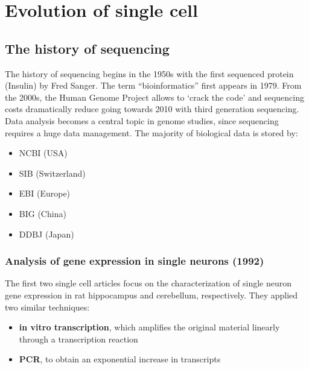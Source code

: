 \graphicspath{{chapters/01/}}
\chapter{Evolution of single cell}

\hypertarget{the-history-of-sequencing}{%
\section{The history of sequencing}\label{the-history-of-sequencing}}

The history of sequencing begins in the 1950s with the first sequenced
protein (Insulin) by Fred Sanger. The term ``bioinformatics'' first
appears in 1979. From the 2000s, the Human Genome Project allows to
`crack the code' and sequencing costs dramatically reduce going towards
2010 with third generation sequencing. Data analysis becomes a central
topic in genome studies, since sequencing requires a huge data
management. The majority of biological data is stored by:

\begin{itemize}
\tightlist
\item
  NCBI (USA)
\item
  SIB (Switzerland)
\item
  EBI (Europe)
\item
  BIG (China)
\item
  DDBJ (Japan)
\end{itemize}

\hypertarget{analysis-of-gene-expression-in-single-neurons-1992}{%
\subsection{Analysis of gene expression in single neurons
(1992)}\label{analysis-of-gene-expression-in-single-neurons-1992}}

The first two single cell articles focus on the characterization of
single neuron gene expression in rat hippocampus and cerebellum,
respectively. They applied two similar techniques:

\begin{itemize}
\tightlist
\item
  \textbf{in vitro transcription},  which amplifies the original material
  linearly through a transcription reaction
\item
  \textbf{PCR},  to obtain an exponential increase in transcripts
\end{itemize}

